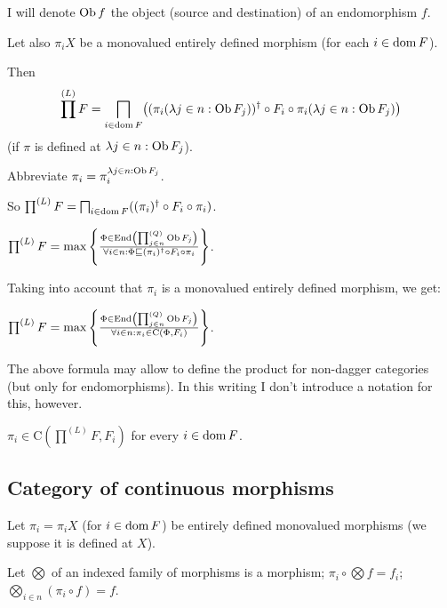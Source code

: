 I will denote $\operatorname{Ob} f$ the object (source and destination) of an
endomorphism $f$.

Let also $\pi_i X$ be a monovalued entirely defined morphism (for each $i \in
\operatorname{dom} F$).

Then \[ \prod^{(L)} F = \bigsqcap_{i \in \operatorname{dom} F} \bigl((\pi_i(\lambda j \in n :
\operatorname{Ob} F_j))^{\dagger} \circ F_i \circ \pi_i(\lambda j \in n : \operatorname{Ob}
F_j)\bigr) \] (if $\pi$ is defined at $\lambda j \in n : \operatorname{Ob} F_j$).

Abbreviate $\pi_i = \pi^{\lambda j \in n : \operatorname{Ob} F_j}_i$.

So $\prod^{(L)} F = \bigsqcap_{i \in \operatorname{dom} F} ((\pi_i)^{\dagger} \circ
F_i \circ \pi_i)$.

$\prod^{(L)} F = \max \left\{ \frac{ \Phi \in \operatorname{End} \left( \prod^{(Q)}_{j \in n}
\operatorname{Ob} F_j \right) }{ \forall i \in n : \Phi
\sqsubseteq (\pi_i)^{\dagger} \circ F_i \circ \pi_i }\right\}$.

Taking into account that $\pi_i$ is a monovalued entirely defined morphism, we
get:

\begin{obvious}
$\prod^{(L)} F = \max \left\{ \frac{ \Phi \in \operatorname{End} \left( \prod^{(Q)}_{j \in
n} \operatorname{Ob} F_j \right) }{ \forall i \in n : \pi_i
\in \mathrm{C} (\Phi , F_i) }\right\}$.
\end{obvious}

\begin{rem}
  The above formula may allow to define the product for non-dagger categories
  (but only for endomorphisms). In this writing I don't introduce a notation
  for this, however.
\end{rem}

\begin{cor}
  $\pi_i \in \mathrm{C} \left( \prod^{(L)} F , F_i \right)$ for every $i \in
  \operatorname{dom} F$.
\end{cor}

\subsection{Category of continuous morphisms}

Let $\pi_i = \pi_i X$ (for $i \in \operatorname{dom} F$) be entirely defined
monovalued morphisms (we suppose it is defined at $X$).

Let $\bigotimes$ of an indexed family of morphisms is a morphism; $\pi_i \circ
\bigotimes f = f_i$; $\bigotimes_{i \in n} (\pi_i \circ f) = f$.

